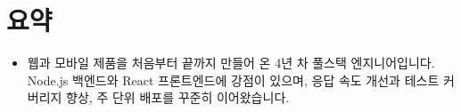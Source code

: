 \section{요약}
\begin{itemize}[leftmargin=0.15in, label={}]
    \item \small{웹과 모바일 제품을 처음부터 끝까지 만들어 온 4년 차 풀스택 엔지니어입니다. Node.js 백엔드와 React 프론트엔드에 강점이 있으며, 응답 속도 개선과 테스트 커버리지 향상, 주 단위 배포를 꾸준히 이어왔습니다.}
\end{itemize}
